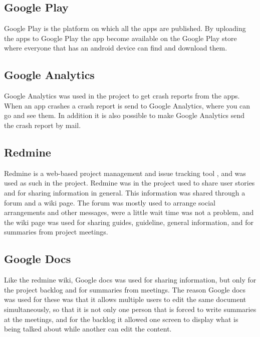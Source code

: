 \subsection{Google Play}
Google Play is the platform on which all the apps are published. By uploading the apps to Google Play the app become available on the Google Play store where everyone that has an android device can find and download them.

\subsection{Google Analytics}
Google Analytics was used in the project to get crash reports from the apps. When an app crashes a crash report is send to Google Analytics, where you can go and see them. In addition it is also possible to make Google Analytics send the crash report by mail.

\subsection{Redmine}
Redmine is a web-based project management and issue tracking tool \citep{Redmine}, and was used as such in the project. Redmine was in the project used to share user stories and for sharing information in general. This information was shared through a forum and a wiki page. The forum was mostly used to arrange social arrangements and other messages, were a little wait time was not a problem, and the wiki page was used for sharing guides, guideline, general information, and for summaries from project meetings.

\subsection{Google Docs}
Like the redmine wiki, Google docs was used for sharing information, but only for the project backlog and for summaries from meetings. The reason Google docs was used for these was that it allows multiple users to edit the same document simultaneously, so that it is not only one person that is forced to write summaries at the meetings, and for the backlog it allowed one screen to display what is being talked about while another can edit the content.